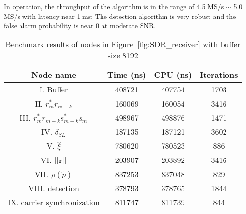 In operation, the throughput of the algorithm is in the range of 4.5 MS/s $\sim$ 5.0 MS/s with latency near 1 ms;
The detection algorithm is very robust and the false alarm probability is near 0 at moderate SNR.

\begin{table}[t]
    \caption{Benchmark results of nodes in Figure~\ref{fig:SDR_receiver} with buffer size 8192}  %
    \centering %
    \begin{tabular}{c c c c} %
    \hline\hline %
    Node name & Time (ns) & CPU (ns) & Iterations \\ [0.5ex] %
    \hline %
    I. Buffer  & 408721 & 407754 & 1703 \\ %
    II. $r_m^*r_{m-k}$  & 160069 & 160054 & 3416 \\
    III. $r_m^*r_{m-k}s_{m-k}^*s_m$ & 498967 & 498876 & 1471 \\
    IV. $\hat{\delta}_{SL}$ & 187135 & 187121 & 3602 \\
    V. $\hat{\xi}$ & 780620 & 780523 & 886 \\
    VI. $||\bm{r}||$ & 203907 & 203892 & 3416 \\ %
    VII. $\rho(\tilde{p})$ & 837253 & 837048 & 829 \\
    VIII. detection & 378793 & 378765 & 1844 \\
    IX. carrier synchronization & 811747 & 811739 & 844  \\ [1ex]
    \hline
    \end{tabular}
    \label{table:BM_function_nodes} %
  \end{table}

